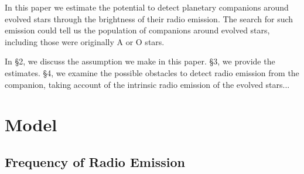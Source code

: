 \documentclass{emulateapj}
\def\memoYF#1{\color{red}$[${\bf #1}$]$ \color{black}}
\begin{document}
In this paper we estimate the potential to detect planetary companions around evolved stars through the brightness of their radio emission. 
The search for such emission could tell us the population of companions around evolved stars, including those were originally A or O stars. 

In \S2, we discuss the assumption we make in this paper. 
\S3, we provide the estimates. 
\S4, we examine the possible obstacles to detect radio emission from the companion, taking account of the intrinsic radio emission of the evolved stars...






\section{Model}
\label{s:assumptions}

\subsection{Frequency of Radio Emission}

\end{document}
